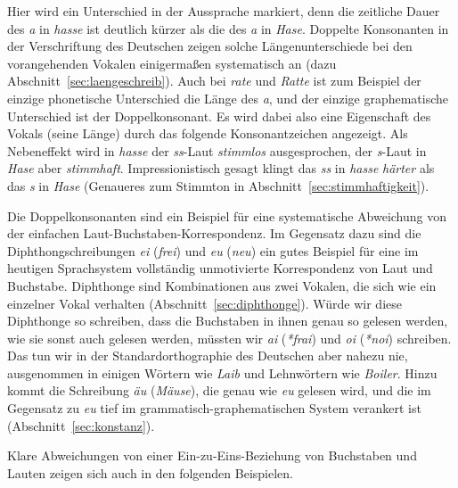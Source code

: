 \begin{exe}
  \ex\label{ex:phot3335}
  \begin{xlist}
  \end{xlist}
\end{exe}

Hier wird ein Unterschied in der Aussprache markiert, denn die zeitliche Dauer des \textit{a} in \textit{hasse} ist deutlich kürzer als die des \textit{a} in \textit{Hase}.
Doppelte Konsonanten in der Verschriftung des Deutschen zeigen solche Längenunterschiede bei den vorangehenden Vokalen einigermaßen systematisch an (dazu Abschnitt~\ref{sec:laengeschreib}).
Auch bei \textit{rate} und \textit{Ratte} ist zum Beispiel der einzige phonetische Unterschied die Länge des \textit{a}, und der einzige graphematische Unterschied ist der Doppelkonsonant.
Es wird dabei also eine Eigenschaft des Vokals (seine Länge) durch das folgende Konsonantzeichen angezeigt.
Als Nebeneffekt wird in \textit{hasse} der \textit{ss}-Laut \textit{stimmlos} ausgesprochen, der \textit{s}-Laut in \textit{Hase} aber \textit{stimmhaft}.
Impressionistisch gesagt klingt das \textit{ss} in \textit{hasse} \textit{härter} als das \textit{s} in \textit{Hase} (Genaueres zum Stimmton in Abschnitt~\ref{sec:stimmhaftigkeit}).

Die Doppelkonsonanten sind ein Beispiel für eine systematische Abweichung von der einfachen Laut-Buchstaben-Korrespondenz.
Im Gegensatz dazu sind die Diphthongschreibungen \textit{ei} (\textit{frei}) und \textit{eu} (\textit{neu}) ein gutes Beispiel für eine im heutigen Sprachsystem vollständig unmotivierte Korrespondenz von Laut und Buchstabe.
Diphthonge sind Kombinationen aus zwei Vokalen, die sich wie ein einzelner Vokal verhalten (Abschnitt~\ref{sec:diphthonge}).
Würde wir diese Diphthonge so schreiben, dass die Buchstaben in ihnen genau so gelesen werden, wie sie sonst auch gelesen werden, müssten wir \textit{ai} (\textit{*frai}) und \textit{oi} (\textit{*noi}) schreiben.
Das tun wir in der Standardorthographie des Deutschen aber nahezu nie, ausgenommen in einigen Wörtern wie \textit{Laib} und Lehnwörtern wie \textit{Boiler}.
Hinzu kommt die Schreibung \textit{äu} (\textit{Mäuse}), die genau wie \textit{eu} gelesen wird, und die im Gegensatz zu \textit{eu} tief im grammatisch-graphematischen System verankert ist (Abschnitt~\ref{sec:konstanz}).

Klare Abweichungen von einer Ein-zu-Eins-Beziehung von Buchstaben und Lauten zeigen sich auch in den folgenden Beispielen.

